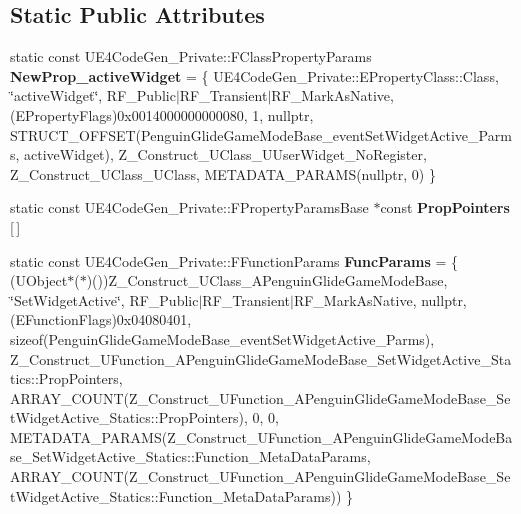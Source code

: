 \subsection*{Static Public Attributes}
\begin{DoxyCompactItemize}
\item 
\mbox{\label{struct_z___construct___u_function___a_penguin_glide_game_mode_base___set_widget_active___statics_a7ca07cbc31eaab110ab1c6ef40646b82}} 
static const U\+E4\+Code\+Gen\+\_\+\+Private\+::\+F\+Class\+Property\+Params {\bfseries New\+Prop\+\_\+active\+Widget} = \{ U\+E4\+Code\+Gen\+\_\+\+Private\+::\+E\+Property\+Class\+::\+Class, \char`\"{}active\+Widget\char`\"{}, R\+F\+\_\+\+Public$\vert$R\+F\+\_\+\+Transient$\vert$R\+F\+\_\+\+Mark\+As\+Native, (E\+Property\+Flags)0x0014000000000080, 1, nullptr, S\+T\+R\+U\+C\+T\+\_\+\+O\+F\+F\+S\+E\+T(\+Penguin\+Glide\+Game\+Mode\+Base\+\_\+event\+Set\+Widget\+Active\+\_\+\+Parms, active\+Widget), Z\+\_\+\+Construct\+\_\+\+U\+Class\+\_\+\+U\+User\+Widget\+\_\+\+No\+Register, Z\+\_\+\+Construct\+\_\+\+U\+Class\+\_\+\+U\+Class, M\+E\+T\+A\+D\+A\+T\+A\+\_\+\+P\+A\+R\+A\+M\+S(nullptr, 0) \}
\item 
static const U\+E4\+Code\+Gen\+\_\+\+Private\+::\+F\+Property\+Params\+Base $\ast$const {\bfseries Prop\+Pointers} \mbox{[}$\,$\mbox{]}
\item 
\mbox{\label{struct_z___construct___u_function___a_penguin_glide_game_mode_base___set_widget_active___statics_a398909cee25705218d1c0ead63feec2b}} 
static const U\+E4\+Code\+Gen\+\_\+\+Private\+::\+F\+Function\+Params {\bfseries Func\+Params} = \{ (U\+Object$\ast$($\ast$)())Z\+\_\+\+Construct\+\_\+\+U\+Class\+\_\+\+A\+Penguin\+Glide\+Game\+Mode\+Base, \char`\"{}Set\+Widget\+Active\char`\"{}, R\+F\+\_\+\+Public$\vert$R\+F\+\_\+\+Transient$\vert$R\+F\+\_\+\+Mark\+As\+Native, nullptr, (E\+Function\+Flags)0x04080401, sizeof(\+Penguin\+Glide\+Game\+Mode\+Base\+\_\+event\+Set\+Widget\+Active\+\_\+\+Parms), Z\+\_\+\+Construct\+\_\+\+U\+Function\+\_\+\+A\+Penguin\+Glide\+Game\+Mode\+Base\+\_\+\+Set\+Widget\+Active\+\_\+\+Statics\+::\+Prop\+Pointers, A\+R\+R\+A\+Y\+\_\+\+C\+O\+U\+N\+T(\+Z\+\_\+\+Construct\+\_\+\+U\+Function\+\_\+\+A\+Penguin\+Glide\+Game\+Mode\+Base\+\_\+\+Set\+Widget\+Active\+\_\+\+Statics\+::\+Prop\+Pointers), 0, 0, M\+E\+T\+A\+D\+A\+T\+A\+\_\+\+P\+A\+R\+A\+M\+S(\+Z\+\_\+\+Construct\+\_\+\+U\+Function\+\_\+\+A\+Penguin\+Glide\+Game\+Mode\+Base\+\_\+\+Set\+Widget\+Active\+\_\+\+Statics\+::\+Function\+\_\+\+Meta\+Data\+Params, A\+R\+R\+A\+Y\+\_\+\+C\+O\+U\+N\+T(\+Z\+\_\+\+Construct\+\_\+\+U\+Function\+\_\+\+A\+Penguin\+Glide\+Game\+Mode\+Base\+\_\+\+Set\+Widget\+Active\+\_\+\+Statics\+::\+Function\+\_\+\+Meta\+Data\+Params)) \}
\end{DoxyCompactItemize}


